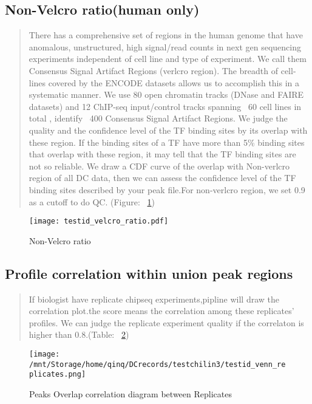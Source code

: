 \documentclass[11pt,a4paper]{article}
\begin{document}
\subsection{Non-Velcro ratio(human only)}
\begin{quotation}
There has a comprehensive set of regions in the human genome that have anomalous, unstructured, high signal/read counts in next gen sequencing experiments independent of cell line and type of experiment. We call them Consensus Signal Artifact Regions (verlcro region). The breadth of cell-lines covered by the ENCODE datasets allows us to accomplish this in a systematic manner.
We use 80 open chromatin tracks (DNase and FAIRE datasets) and 12 ChIP-seq input/control tracks spanning ~60 cell lines in total , identify ~400 Consensus Signal Artifact Regions. We judge the quality and the confidence level of the TF binding sites by its overlap with these region. If the binding sites of a TF have more than 5\% binding sites that overlap with these region, it may tell that the TF binding sites are not so reliable.
We draw a CDF curve of the overlap with Non-verlcro region of all DC data, then we can assess the confidence level of  the TF binding sites described by your peak file.For non-verlcro region, we set 0.9 as a cutoff to do QC. (Figure: ~\ref{fig:velcro})
\end{quotation}
\begin{figure}[h] 
\caption{Non-Velcro ratio} \label{fig:velcro}
\setlength{\abovecaptionskip}{0pt} 
\setlength{\belowcaptionskip}{10pt}
\centering
{\texttt{[image: testid\_velcro\_ratio.pdf]}}
\end{figure}
\newpage

\subsection{Profile correlation within union peak regions}
\begin{quotation}
If biologist have replicate chipseq experiments,pipline will draw the correlation plot.the score means the correlation among these replicates' profiles. We can judge the replicate experiment quality if the correlaton is higher than 0.8.(Table: ~\ref{fig:profileunion})
\end{quotation}
\begin{figure}[h]
        \caption{Peaks Overlap correlation diagram between Replicates} \label{fig:profileunion}
        \setlength{\abovecaptionskip}{0pt}
        \setlength{\belowcaptionskip}{10pt}
        \centering
        {\texttt{[image: /mnt/Storage/home/qinq/DCrecords/testchilin3/testid\_venn\_replicates.png]}}
\end{figure}
\newpage
\end{document}
